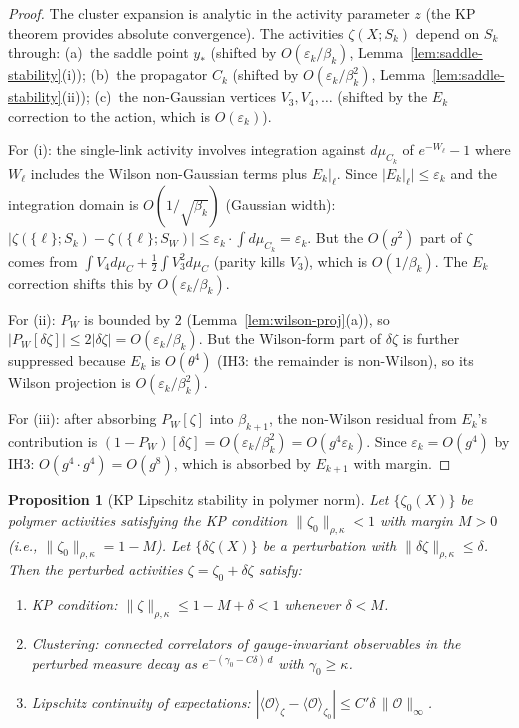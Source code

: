 \documentclass[11pt]{article}
\newtheorem{proposition}[theorem]{Proposition}
\theoremstyle{definition}
\begin{document}
\begin{proof}
The cluster expansion is analytic in the activity parameter
$z$ (the KP theorem provides absolute convergence).
The activities $\zeta(X;S_k)$ depend on $S_k$ through:
(a)~the saddle point $y_*$ (shifted by
$O(\varepsilon_k/\beta_k)$, Lemma~\ref{lem:saddle-stability}(i));
(b)~the propagator $C_k$ (shifted by $O(\varepsilon_k/\beta_k^2)$,
Lemma~\ref{lem:saddle-stability}(ii));
(c)~the non-Gaussian vertices $V_3,V_4,\ldots$ (shifted by
the $E_k$ correction to the action, which is $O(\varepsilon_k)$).

For (i): the single-link activity involves integration against
$d\mu_{C_k}$ of $e^{-W_\ell}-1$ where $W_\ell$ includes
the Wilson non-Gaussian terms plus $E_k|_\ell$.
Since $|E_k|_\ell|\le\varepsilon_k$ and the integration
domain is $O(1/\sqrt{\beta_k})$ (Gaussian width):
$|\zeta(\{\ell\};S_k)-\zeta(\{\ell\};S_W)|
\le\varepsilon_k\cdot\int d\mu_{C_k}=\varepsilon_k$.
But the $O(g^2)$ part of $\zeta$ comes from
$\int V_4 d\mu_C+\frac{1}{2}\int V_3^2 d\mu_C$
(parity kills $V_3$), which is $O(1/\beta_k)$.
The $E_k$ correction shifts this by $O(\varepsilon_k/\beta_k)$.

For (ii): $P_W$ is bounded by $2$ (Lemma~\ref{lem:wilson-proj}(a)),
so $|P_W[\delta\zeta]|\le 2|\delta\zeta|=O(\varepsilon_k/\beta_k)$.
But the Wilson-form part of $\delta\zeta$ is further suppressed
because $E_k$ is $O(\theta^4)$ (IH3: the remainder is non-Wilson),
so its Wilson projection is $O(\varepsilon_k/\beta_k^2)$.

For (iii): after absorbing $P_W[\zeta]$ into $\beta_{k+1}$,
the non-Wilson residual from $E_k$'s contribution is
$(1-P_W)[\delta\zeta]=O(\varepsilon_k/\beta_k^2)=O(g^4\varepsilon_k)$.
Since $\varepsilon_k=O(g^4)$ by IH3:
$O(g^4\cdot g^4)=O(g^8)$, which is absorbed by $E_{k+1}$
with margin.
\end{proof}

\begin{proposition}[KP Lipschitz stability in polymer norm]%
\label{prop:kp-lipschitz}
Let $\{\zeta_0(X)\}$ be polymer activities satisfying the
KP condition $\|\zeta_0\|_{\rho,\kappa}<1$ with margin $M>0$
\textup{(}i.e., $\|\zeta_0\|_{\rho,\kappa}=1-M$\textup{)}.
Let $\{\delta\zeta(X)\}$ be a perturbation with
$\|\delta\zeta\|_{\rho,\kappa}\le\delta$.
Then the perturbed activities $\zeta=\zeta_0+\delta\zeta$
satisfy:
\begin{enumerate}[nosep,label=\textup{(\roman*)}]
\item KP condition:
$\|\zeta\|_{\rho,\kappa}\le 1-M+\delta<1$ whenever $\delta<M$.
\item Clustering:
connected correlators of gauge-invariant observables
in the perturbed measure decay as
$e^{-(\gamma_0-C\delta)\,d}$ with $\gamma_0\ge\kappa$.
\item Lipschitz continuity of expectations:
$|\langle\mathcal{O}\rangle_\zeta
-\langle\mathcal{O}\rangle_{\zeta_0}|
\le C'\delta\,\|\mathcal{O}\|_\infty$.
\end{enumerate}
\end{proposition}
\end{document}
